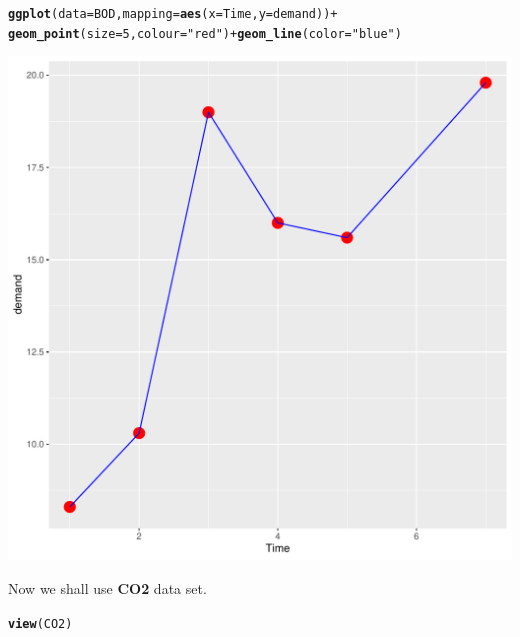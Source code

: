 \documentclass[11pt, a4paper]{article}\usepackage[]{graphicx}\usepackage[]{xcolor}
\makeatletter
\def\maxwidth{ %
  \ifdim\Gin@nat@width>\linewidth
    \linewidth
  \else
    \Gin@nat@width
  \fi
}
\newcommand{\hlnum}[1]{\textcolor[rgb]{0.686,0.059,0.569}{#1}}%
\newcommand{\hlstr}[1]{\textcolor[rgb]{0.192,0.494,0.8}{#1}}%
\newcommand{\hlopt}[1]{\textcolor[rgb]{0,0,0}{#1}}%
\newcommand{\hlstd}[1]{\textcolor[rgb]{0.345,0.345,0.345}{#1}}%
\newcommand{\hlkwc}[1]{\textcolor[rgb]{0.333,0.667,0.333}{#1}}%
\newcommand{\hlkwd}[1]{\textcolor[rgb]{0.737,0.353,0.396}{\textbf{#1}}}%
\newenvironment{kframe}{%
 \def\at@end@of@kframe{}%
 \ifinner\ifhmode%
  \def\at@end@of@kframe{\end{minipage}}%
  \begin{minipage}{\columnwidth}%
 \fi\fi%
 \def\FrameCommand##1{\hskip\@totalleftmargin \hskip-\fboxsep
 \colorbox{shadecolor}{##1}\hskip-\fboxsep
     \hskip-\linewidth \hskip-\@totalleftmargin \hskip\columnwidth}%
 \MakeFramed {\advance\hsize-\width
   \@totalleftmargin\z@ \linewidth\hsize
   \@setminipage}}%
 {\par\unskip\endMakeFramed%
 \at@end@of@kframe}
\newenvironment{knitrout}{}{} %
\makeatother
\begin{document}
\begin{knitrout}
\color{fgcolor}\begin{kframe}
\begin{alltt}
\hlkwd{ggplot}\hlstd{(}\hlkwc{data} \hlstd{= BOD,} \hlkwc{mapping} \hlstd{=} \hlkwd{aes}\hlstd{(}\hlkwc{x} \hlstd{= Time,} \hlkwc{y} \hlstd{= demand))} \hlopt{+}
    \hlkwd{geom_point}\hlstd{(}\hlkwc{size} \hlstd{=} \hlnum{5}\hlstd{,} \hlkwc{colour} \hlstd{=} \hlstr{"red"}\hlstd{)} \hlopt{+} \hlkwd{geom_line}\hlstd{(}\hlkwc{color} \hlstd{=} \hlstr{"blue"}\hlstd{)}
\end{alltt}
\end{kframe}
\includegraphics[width=\maxwidth]{figure/unnamed-chunk-5-1} 
\end{knitrout}

Now we shall use \textbf{CO2} data set.

\begin{knitrout}
\color{fgcolor}\begin{kframe}
\begin{alltt}
\hlkwd{view}\hlstd{(CO2)}
\end{alltt}
\end{kframe}
\end{knitrout}
\end{document}
